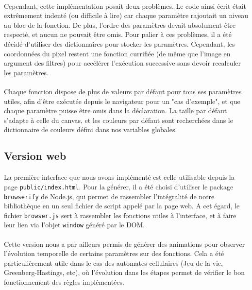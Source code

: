 \documentclass[a4paper]{article}
\begin{document}
\paragraph{}
Cependant, cette implémentation posait deux problèmes. Le code ainsi écrit était extrêmement indenté (ou difficile à lire) car chaque paramètre rajoutait un niveau au bloc de la fonction. De plus, l'ordre des paramètres devait absolument être respecté, et aucun ne pouvait être omis. Pour palier à ces problèmes, il a été décidé d'utiliser des dictionnaires pour stocker les paramètres. Cependant, les coordonnées du pixel restent une fonction currifiée (de même que l'image en argument des filtres) pour accélérer l'exécution successive sans devoir recalculer les paramètres.

\paragraph{}
Chaque fonction dispose de plus de valeurs par défaut pour tous ses paramètres utiles, afin d'être exécutée depuis le navigateur pour un "cas d'exemple", et que chaque paramètre puisse être omis dans la déclaration. La taille par défaut s'adapte à celle du canvas, et les couleurs par défaut sont recherchées dans le dictionnaire de couleurs défini dans nos variables globales.



\subsection{Version web}
\label{sec:web}

\paragraph{}
La première interface que nous avons implémenté est celle utilisable depuis la page \texttt{public/index.html}. Pour la générer, il a été choisi d'utiliser le package \texttt{browserify} de Node.js, qui permet de rassembler l'intégralité de notre bibliothèque en un seul fichier de script appelé par la page web. A cet égard, le fichier \texttt{browser.js} sert à rassembler les fonctions utiles à l'interface, et à faire leur lien via l'objet \texttt{window} généré par le DOM.

\paragraph{}
Cette version nous a par ailleurs permis de générer des animations pour observer l'évolution temporelle de certains paramètres sur des fonctions. Cela a été particulièrement utile dans le cas des automates cellulaires (Jeu de la vie, Greenberg-Hastings, etc), où l'évolution dans les étapes permet de vérifier le bon fonctionnement des règles implémentées.
\end{document}
